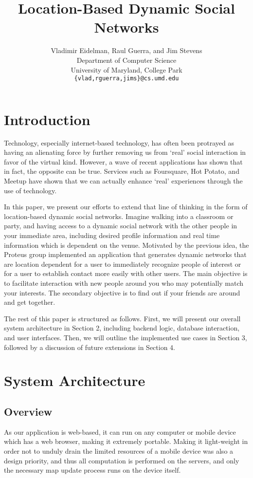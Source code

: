 \documentclass[11pt]{article}
\title{Location-Based Dynamic Social Networks}
\author{
   Vladimir Eidelman, Raul Guerra, and Jim Stevens\\
Department of Computer Science \\
University of Maryland, College Park\\
 { \tt \{vlad,rguerra,jims\}@cs.umd.edu}
}
\begin{document}
\maketitle 

\section{Introduction}


Technology, especially internet-based technology, has often been protrayed as having an alienating force by further removing us from `real' social interaction in favor of the virtual kind. However, a wave of recent applications has shown that in fact, the opposite can be true. Services such as Foursquare, Hot Potato, and Meetup have shown that we can actually enhance `real' experiences through the use of technology. 

In this paper, we present our efforts to extend that line of thinking in the form of location-based dynamic social networks. Imagine walking into a classroom or party, and having access to a dynamic social network with the other people in your immediate area, including desired profile information and real time information which is dependent on the venue. Motivated by the previous idea, the Proteus group implemented an application that generates dynamic networks that are location dependent for a user to immediately recognize people of interest or for a user to establish contact more easily with other users. The main objective is to facilitate interaction with new people around you who may potentially match your interests. The secondary objective is to find out if your friends are around and get together. 

The rest of this paper is structured as follows. First, we will present our overall system architecture in Section 2, including backend logic, database interaction, and user interfaces. Then, we will outline the implemented use cases in Section 3, followed by a discussion of future extensions in Section 4.


\section{System Architecture}

\subsection{Overview}

As our application is web-based, it can run on any computer or mobile device which has a web browser, making it extremely portable. Making it light-weight in order not to unduly drain the limited resources of a mobile device was also a design priority, and thus all computation is performed on the servers, and only the necessary map update process runs on the device itself. 
\end{document}
